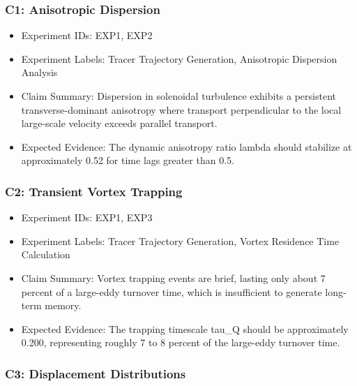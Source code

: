 \documentclass[11pt]{article}
\begin{document}
\subsubsection*{C1: Anisotropic Dispersion}

\begin{itemize}

\item Experiment IDs: EXP1, EXP2

\item Experiment Labels: Tracer Trajectory Generation, Anisotropic Dispersion Analysis

\item Claim Summary: Dispersion in solenoidal turbulence exhibits a persistent transverse-dominant anisotropy where transport perpendicular to the local large-scale velocity exceeds parallel transport.

\item Expected Evidence: The dynamic anisotropy ratio lambda should stabilize at approximately 0.52 for time lags greater than 0.5.

\end{itemize}

\subsubsection*{C2: Transient Vortex Trapping}

\begin{itemize}

\item Experiment IDs: EXP1, EXP3

\item Experiment Labels: Tracer Trajectory Generation, Vortex Residence Time Calculation

\item Claim Summary: Vortex trapping events are brief, lasting only about 7 percent of a large-eddy turnover time, which is insufficient to generate long-term memory.

\item Expected Evidence: The trapping timescale tau\_Q should be approximately 0.200, representing roughly 7 to 8 percent of the large-eddy turnover time.

\end{itemize}

\subsubsection*{C3: Displacement Distributions}
\end{document}
